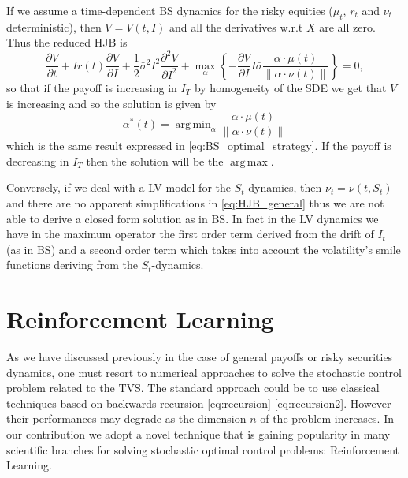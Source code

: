 \documentclass[11pt]{article}
\DeclareMathOperator*{\argmax}{arg\,max}
\DeclareMathOperator*{\argmin}{arg\,min}
\begin{document}
If we assume a time-dependent BS dynamics for the risky equities ($\mu_t$, $r_t$ and $\nu_t$ deterministic), then $V = V(t,I)$ and all the derivatives w.r.t $X$ are all zero. Thus the reduced HJB is
\begin{equation}
	\frac{\partial V}{\partial t} +  I r(t)\frac{\partial V}{\partial I}  + \frac{1}{2}\bar{\sigma}^2I^2\frac{\partial^2V}{\partial I^2} + \max_\alpha \left\{ -\frac{\partial V}{\partial I} I  \bar{\sigma}\frac{\alpha \cdot \mu(t)}{\|\alpha \cdot \nu(t)\|}\right\} = 0,
\end{equation}
so that if the payoff is increasing in $I_T$ by homogeneity of the SDE we get that $V$ is increasing and so the solution is given by
\begin{equation}
 \alpha^*(t) = \argmin_\alpha \frac{\alpha \cdot \mu(t)}{\|\alpha \cdot \nu(t)\|}
	\end{equation}
which is the same result expressed in \cref{eq:BS_optimal_strategy}. If the payoff is decreasing in $I_T$ then the solution will be the $\argmax$.

Conversely, if we deal with a LV model for the $S_t$-dynamics, then $\nu_t = \nu(t,S_t)$ and there are no apparent simplifications in \cref{eq:HJB_general} thus we are not able to derive a closed form solution as in BS. In fact in the LV dynamics we have in the maximum operator the first order term derived from the drift of $I_t$ (as in BS) and a second order term which takes into account the volatility's smile functions deriving from the $S_t$-dynamics. 


\section{Reinforcement Learning}\label{sec:RL}
As we have discussed previously in the case of general payoffs or risky securities dynamics, one must resort to numerical approaches to solve the stochastic control problem related to the TVS. The standard approach could be to use classical techniques based on backwards recursion \eqref{eq:recursion}-\eqref{eq:recursion2}. However their performances may degrade as the dimension $n$ of the problem increases. In our contribution we adopt a novel technique that is gaining popularity in many scientific branches for solving stochastic optimal control problems: Reinforcement Learning. 
\end{document}

